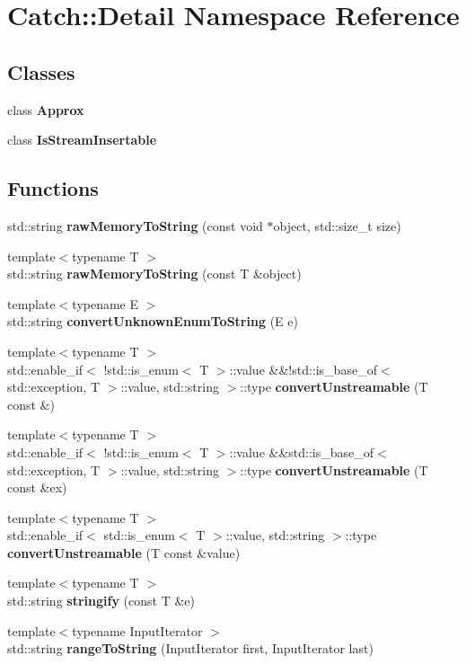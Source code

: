 \section{Catch\+::Detail Namespace Reference}
\label{namespace_catch_1_1_detail}
\subsection*{Classes}
\begin{DoxyCompactItemize}
\item 
class \textbf{ Approx}
\item 
class \textbf{ Is\+Stream\+Insertable}
\end{DoxyCompactItemize}
\subsection*{Functions}
\begin{DoxyCompactItemize}
\item 
std\+::string \textbf{ raw\+Memory\+To\+String} (const void $\ast$object, std\+::size\+\_\+t size)
\item 
{\footnotesize template$<$typename T $>$ }\\std\+::string \textbf{ raw\+Memory\+To\+String} (const T \&object)
\item 
{\footnotesize template$<$typename E $>$ }\\std\+::string \textbf{ convert\+Unknown\+Enum\+To\+String} (E e)
\item 
{\footnotesize template$<$typename T $>$ }\\std\+::enable\+\_\+if$<$ !std\+::is\+\_\+enum$<$ T $>$\+::value \&\&!std\+::is\+\_\+base\+\_\+of$<$ std\+::exception, T $>$\+::value, std\+::string $>$\+::type \textbf{ convert\+Unstreamable} (T const \&)
\item 
{\footnotesize template$<$typename T $>$ }\\std\+::enable\+\_\+if$<$ !std\+::is\+\_\+enum$<$ T $>$\+::value \&\&std\+::is\+\_\+base\+\_\+of$<$ std\+::exception, T $>$\+::value, std\+::string $>$\+::type \textbf{ convert\+Unstreamable} (T const \&ex)
\item 
{\footnotesize template$<$typename T $>$ }\\std\+::enable\+\_\+if$<$ std\+::is\+\_\+enum$<$ T $>$\+::value, std\+::string $>$\+::type \textbf{ convert\+Unstreamable} (T const \&value)
\item 
{\footnotesize template$<$typename T $>$ }\\std\+::string \textbf{ stringify} (const T \&e)
\item 
{\footnotesize template$<$typename Input\+Iterator $>$ }\\std\+::string \textbf{ range\+To\+String} (Input\+Iterator first, Input\+Iterator last)
\end{DoxyCompactItemize}
